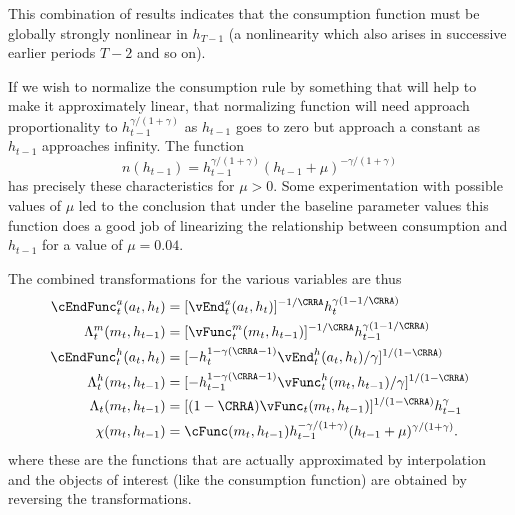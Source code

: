 \documentclass[titlepage]{\econtex}
\begin{document}
{  This combination of results indicates that the consumption function
  must be globally strongly nonlinear in $h_{T-1}$ (a nonlinearity which
  also arises in successive earlier periods $T-2$ and so on).

  If we wish to normalize the consumption rule by something that will
  help to make it approximately linear, that normalizing function will
  need approach proportionality to $h_{t-1}^{\gamma/(1+\gamma)}$ as
  $h_{t-1}$ goes to zero but approach a constant as $h_{t-1}$ approaches
  infinity.  The function
  \begin{equation}
    n(h_{t-1}) =
    h_{t-1}^{\gamma/(1+\gamma)}(h_{t-1}+\mu)^{-\gamma/(1+\gamma)}
  \end{equation}
  has precisely these characteristics for $\mu>0$.  Some
  experimentation with possible values of $\mu$ led to the conclusion
  that under the baseline parameter values this function does a good job
  of linearizing the relationship between consumption and $h_{t-1}$ for
  a value of $\mu = 0.04$.

  The combined transformations for the various variables are thus
  \begin{equation}\begin{gathered}\begin{aligned}
    \cEndFunc_{t}^{{a}}({a}_{t},h_{t})        & = [\vEnd_{t}^{{a}}({a}_{t},h_{t})]^{-1/\CRRA} h_{t}^{\gamma(1-1/\CRRA)} \label{eq:vEndstransform} \\
    \Lambda_{t}^{m}({m}_{t},h_{t-1})   & = [{\vFunc}_{t}^{m}({m}_{t},h_{t-1})]^{-1/\CRRA} h_{t-1}^{\gamma(1-1/\CRRA)} \label{eq:vxtransform} \\
    \cEndFunc_{t}^{h}({a}_{t},h_{t})       
& =                                                  [-h_{t}^{1-\gamma(\CRRA-1)}\vEnd_{t}^{h}({a}_{t},h_{t})/\gamma]^{1/(1-\CRRA)}  \label{eq:vEndhtransform}
    \\      \Lambda_{t}^{h}({m}_{t},h_{t-1})   & = [-h_{t-1}^{1-\gamma(\CRRA-1)}{\vFunc}_{t}^{h}({m}_{t},h_{t-1})/\gamma]^{1/(1-\CRRA)} \label{eq:vhtransform}
    \\      \Lambda_{t}({m}_{t},h_{t-1})       & = [(1-\CRRA)
                                                    {\vFunc}_{t}({m}_{t},h_{t-1})]^{1/(1-\CRRA)} h_{t-1}^{\gamma}\label{eq:vtransform}
    \\  \chi({m}_{t},h_{t-1})       & = \cFunc({m}_{t},h_{t-1})h_{t-1}^{-\gamma/(1+\gamma)}(h_{t-1}+\mu)^{\gamma/(1+\gamma)}.
  \end{aligned}\end{gathered}\end{equation}
  where these are the functions that are actually approximated by
  interpolation and the objects of interest (like the consumption
  function) are obtained by reversing the transformations.

}
\end{document}
